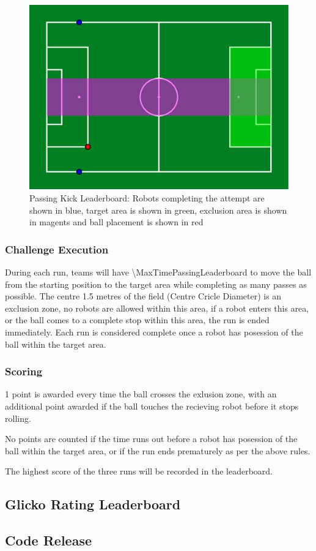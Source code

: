 \begin{figure}[t]
    \centerline{\includegraphics[width=\columnwidth]{figs/passing_leaderboard.pdf}}
    \caption{Passing Kick Leaderboard: Robots completing the attempt are shown in blue, target area is shown in green, exclusion area is shown in magents and ball placement is shown in red}
    \label{fig:passing_leaderboard}
\end{figure}
\subsubsection{Challenge Execution}
During each run, teams will have \qty{\MaxTimePassingLeaderboard}{\sec} to move the ball from the starting
position to the target area while completing as many passes as possible. The centre
1.5 metres of the field (Centre Cricle Diameter) is an exclusion zone, no robots are allowed within this area,
if a robot enters this area, or the ball comes to a complete stop
within this area, the run is ended immediately. Each run is considered complete
once a robot has posession of the ball within the target area.

\subsubsection{Scoring}
1 point is awarded every time the ball crosses the exlusion zone, with an additional point
awarded if the ball touches the recieving robot before it stops rolling.

No points are counted if the time runs out before a robot has posession of the ball
within the target area, or if the run ends prematurely as per the above rules.

The highest score of the three runs will be recorded in the leaderboard.

\subsection{Glicko Rating Leaderboard}

\subsection{Code Release}
